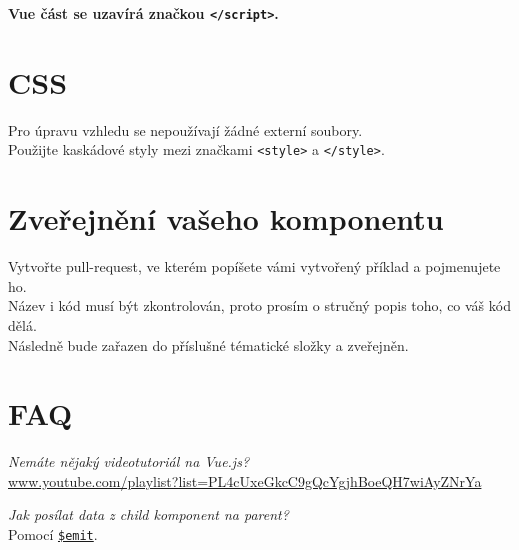 \documentclass[
]{article}
\begin{document}
\textbf{Vue část se uzavírá značkou
\texttt{\textless{}/script\textgreater{}}.}

\hypertarget{css}{%
\section{CSS}\label{css}}

Pro úpravu vzhledu se nepoužívají žádné externí soubory.\\
Použijte kaskádové styly mezi značkami
\texttt{\textless{}style\textgreater{}} a
\texttt{\textless{}/style\textgreater{}}.

\hypertarget{zveux159ejnux11bnuxed-vaux161eho-komponentu}{%
\section{Zveřejnění vašeho
komponentu}\label{zveux159ejnux11bnuxed-vaux161eho-komponentu}}

Vytvořte pull-request, ve kterém popíšete vámi vytvořený příklad a
pojmenujete ho.\\
Název i kód musí být zkontrolován, proto prosím o stručný popis toho, co
váš kód dělá.\\
Následně bude zařazen do příslušné tématické složky a zveřejněn.

\hypertarget{faq}{%
\section{FAQ}\label{faq}}

\emph{Nemáte nějaký videotutoriál na Vue.js?}\\
\href{https://www.youtube.com/playlist?list=PL4cUxeGkcC9gQcYgjhBoeQH7wiAyZNrYa}{www.youtube.com/playlist?list=PL4cUxeGkcC9gQcYgjhBoeQH7wiAyZNrYa}

\emph{Jak posílat data z child komponent na parent?}\\
Pomocí
\href{https://vuejs.org/v2/guide/components.html\#Listening-to-Child-Components-Events}{\texttt{\$emit}}.
\end{document}
